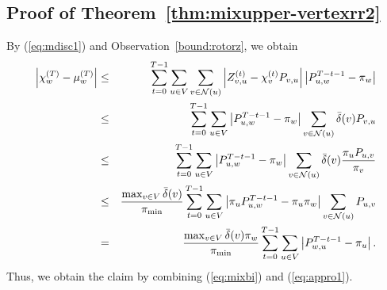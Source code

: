 \documentclass[letter, 11pt]{article}
\newcommand{\1}{\mbox{1}\hspace{-0.25em}\mbox{l}}
\begin{document}
\subsection{Proof of Theorem~\ref{thm:mixupper-vertexrr2}}\label{appendix:rotor}
By (\ref{eq:mdisc1}) and Observation~\ref{bound:rotorz}, we obtain 
\begin{eqnarray}
\label{eq:appro1}
\left| \chi ^{(T)}_w-\mu ^{(T)}_w\right| 
&\leq &\sum_{t=0}^{T-1} \sum_{u\in V} \sum_{v\in {\cal N}(u)}\left| Z_{v, u}^{(t)}-\chi_v^{(t)}P_{v, u}\right|  \left| P^{T-t-1}_{u, w}-\pi_w \right| \nonumber \\
&\leq &\sum_{t=0}^{T-1} \sum_{u\in V} \left| P^{T-t-1}_{u, w}-\pi_w \right| \sum_{v\in {\cal N}(u)}{\bar \delta}(v)P_{v,u} \nonumber \\
&\leq &\sum_{t=0}^{T-1} \sum_{u\in V} \left| P^{T-t-1}_{u, w}-\pi_w \right| \sum_{v\in {\cal N}(u)}{\bar \delta}(v)\frac{\pi_u P_{u,v}}{\pi_v} \nonumber \\
&\leq &\frac{\max_{v\in V}{\bar \delta}(v)}{\pi_{\min}}\sum_{t=0}^{T-1} \sum_{u\in V} \left| \pi_u P^{T-t-1}_{u, w}-\pi_u \pi_w \right| \sum_{v\in {\cal N}(u)}P_{u,v} \nonumber \\
&=&\frac{\max_{v\in V}{\bar \delta}(v)\pi_w}{\pi_{\min}}\sum_{t=0}^{T-1} \sum_{u\in V} \left| P^{T-t-1}_{w,u}-\pi_u \right|. 
\end{eqnarray}
Thus, we obtain the claim by combining (\ref{eq:mixbi}) and (\ref{eq:appro1}).
\end{document}
